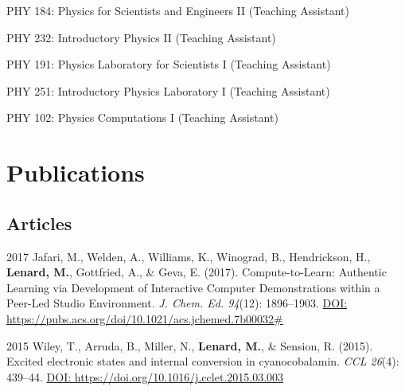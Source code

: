 \documentclass[12pt,letterpaper]{report}
\newcommand{\listitemspace}{0.25em}
\renewenvironment{itemize}
{\begin{list}{}{\setlength{\leftmargin}{0em}
            \setlength{\parskip}{0em}
            \setlength{\itemsep}{\listitemspace}
            \setlength{\parsep}{\listitemspace}}}
{\end{list}}
\begin{document}
\begin{itemize}

        \item PHY 184: Physics for Scientists and Engineers II (Teaching Assistant)
        
        \item PHY 232: Introductory Physics II (Teaching Assistant)
        
        \item PHY 191: Physics Laboratory for Scientists I (Teaching Assistant)
        
        \item PHY 251: Introductory Physics Laboratory I (Teaching Assistant)
        
        \item PHY 102: Physics Computations I (Teaching Assistant)

\end{itemize}



\section*{Publications}

\subsection*{Articles}

\begin{tablist}
   
        
        \item[2017] \tab Jafari, M., Welden, A., Williams, K., Winograd, B., Hendrickson, H., \textbf{Lenard, M.}, Gottfried, A., \& Geva, E. (2017). Compute-to-Learn: Authentic Learning via Development of Interactive Computer Demonstrations within a Peer-Led Studio Environment. \textit{J. Chem. Ed. 94}(12): 1896--1903. \href{https://pubs.acs.org/doi/10.1021/acs.jchemed.7b00032\#}{DOI: https://pubs.acs.org/doi/10.1021/acs.jchemed.7b00032\#}

        \item[2015] \tab Wiley, T., Arruda, B., Miller, N., \textbf{Lenard, M.}, \& Sension, R. (2015). Excited electronic states and internal conversion in cyanocobalamin. \textit{CCL 26}(4): 439--44. \href{https://doi.org/10.1016/j.cclet.2015.03.003}{DOI: https://doi.org/10.1016/j.cclet.2015.03.003}

\end{tablist}
\end{document}
